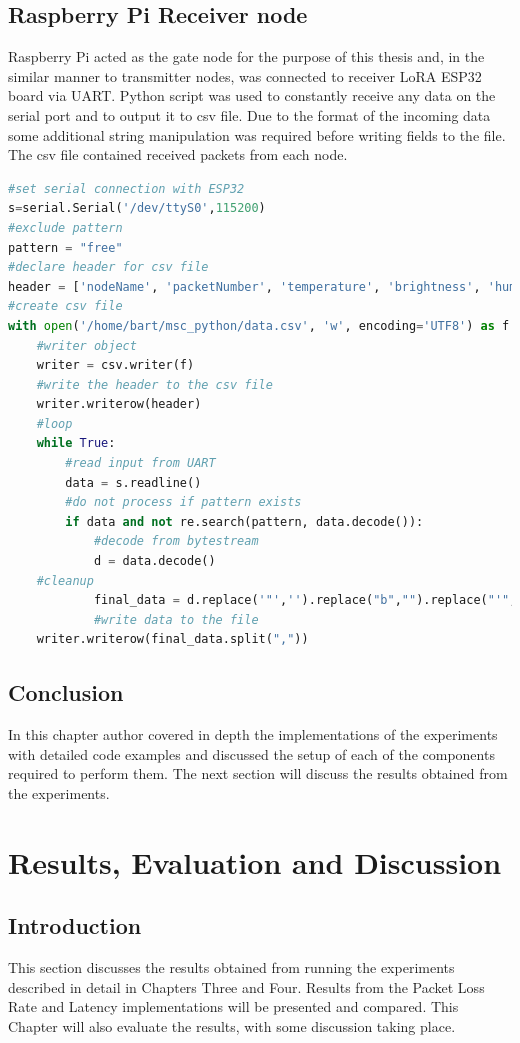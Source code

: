 \documentclass[oneside,12pt]{book}
\begin{document}
\section{Raspberry Pi Receiver node}
Raspberry Pi acted as the gate node for the purpose of this thesis and, in the similar manner to transmitter nodes, was connected to receiver LoRA ESP32 board via UART. Python script was used to constantly receive any data on the serial port and to output it to csv file. Due to the format of the incoming data some additional string manipulation was required before writing fields to the file. The csv file contained received packets from each node. 
\begin{lstlisting}[language=Python, caption={Receiver Raspberry Pi code - Python3},captionpos=b ]
#set serial connection with ESP32
s=serial.Serial('/dev/ttyS0',115200)
#exclude pattern
pattern = "free"
#declare header for csv file
header = ['nodeName', 'packetNumber', 'temperature', 'brightness', 'humidity', 'onBoardTemp']
#create csv file
with open('/home/bart/msc_python/data.csv', 'w', encoding='UTF8') as f:
    #writer object
    writer = csv.writer(f)
    #write the header to the csv file
    writer.writerow(header)
    #loop
    while True:
        #read input from UART
        data = s.readline()
        #do not process if pattern exists
        if data and not re.search(pattern, data.decode()):
            #decode from bytestream
            d = data.decode()
	#cleanup
            final_data = d.replace('"','').replace("b","").replace("'", "").replace("\r","").replace("\n","").replace("-",",").replace(" ","")
            #write data to the file
	writer.writerow(final_data.split(","))
\end{lstlisting}
\section{Conclusion}
In this chapter author covered in depth the implementations of the experiments with detailed code examples and discussed the setup of each of the components required to perform them. The next section will discuss the results obtained from the experiments.
\chapter{Results, Evaluation and Discussion}
\section{Introduction}
This section discusses the results obtained from running the experiments described in detail in Chapters Three and Four. Results from the Packet Loss Rate  and Latency implementations will be presented and compared. This Chapter will also evaluate the results, with some discussion taking place.
\end{document}
